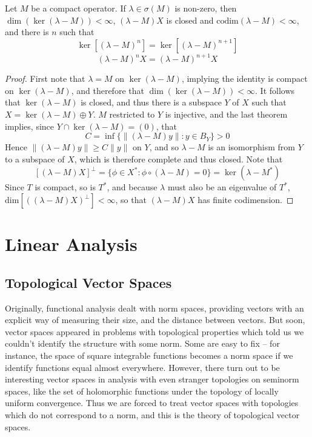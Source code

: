 \begin{corollary}
    Let $M$ be a compact operator. If $\lambda \in \sigma(M)$ is non-zero, then $\dim(\ker(\lambda - M)) < \infty$, $(\lambda - M)X$ is closed and $\text{codim}(\lambda - M) < \infty$, and there is $n$ such that
    \[ \ker[(\lambda - M)^n] = \ker[(\lambda - M)^{n+1}] \]
    \[ (\lambda - M)^n X = (\lambda - M)^{n+1} X \]
\end{corollary}
\begin{proof}
    First note that $\lambda = M$ on $\ker(\lambda - M)$, implying the identity is compact on $\ker(\lambda - M)$, and therefore that $\dim(\ker(\lambda - M)) < \infty$. It follows that $\ker(\lambda - M)$ is closed, and thus there is a subspace $Y$ of $X$ such that $X = \ker(\lambda - M) \oplus Y$. $M$ restricted to $Y$ is injective, and the last theorem implies, since $Y \cap \ker(\lambda - M) = (0)$, that
    \[ C = \inf \{ \| (\lambda - M)y \| : y \in B_Y \} > 0 \]
    Hence $\| (\lambda - M)y \| \geq C \|y\|$ on $Y$, and so $\lambda - M$ is an isomorphism from $Y$ to a subspace of $X$, which is therefore complete and thus closed. Note that
    \[ [(\lambda - M)X]^\perp = \{ \phi \in X^*: \phi \circ (\lambda - M) = 0 \} = \ker( \lambda - M^*) \]
    Since $T$ is compact, so is $T^*$, and because $\lambda$ must also be an eigenvalue of $T^*$, $\text{dim}[((\lambda - M)X)^\perp] < \infty$, so that $(\lambda - M)X$ has finite codimension.
\end{proof}









\part{Linear Analysis}

\chapter{Topological Vector Spaces}

Originally, functional analysis dealt with norm spaces, providing vectors with an explicit way of measuring their size, and the distance between vectors. But soon, vector spaces appeared in problems with topological properties which told us we couldn't identify the structure with some norm. Some are easy to fix -- for instance, the space of square integrable functions becomes a norm space if we identify functions equal almost everywhere. However, there turn out to be interesting vector spaces in analysis with even stranger topologies on seminorm spaces, like the set of holomorphic functions under the topology of locally uniform convergence. Thus we are forced to treat vector spaces with topologies which do not correspond to a norm, and this is the theory of topological vector spaces.

